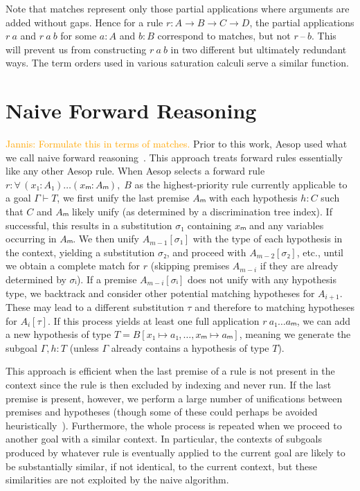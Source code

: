 \documentclass[runningheads]{llncs}
\newcommand{\jcom}[1]{{\textcolor{orange}{Jannis: #1}} }
\newcommand{\All}[2]{\ensuremath{\forall\, #1,\; #2}}
\begin{document}
Note that matches represent only those partial applications where arguments are added without gaps.
Hence for a rule $r : A → B → C → D$, the partial applications $r~a$ and $r~a~b$ for some $a : A$ and $b : B$ correspond to matches, but not $r~\text{--}~b$.
This will prevent us from constructing $r~a~b$ in two different but ultimately redundant ways.
The term orders used in various saturation calculi serve a similar function.

\section{Naive Forward Reasoning}%
\label{sec:naive}

\jcom{Formulate this in terms of matches.}
Prior to this work, Aesop used what we call naive forward reasoning~\cite{Aesop}.
This approach treats forward rules essentially like any other Aesop rule.
When Aesop selects a forward rule $r : \All{(x₁ : A₁) \dots (xₘ : Aₘ)}{B}$ as the highest-priority rule currently applicable to a goal $Γ ⊢ T$, we first unify the last premise $Aₘ$ with each hypothesis $h : C$ such that $C$ and $Aₘ$ likely unify (as determined by a discrimination tree index).
If successful, this results in a substitution $σ₁$ containing $xₘ$ and any variables occurring in $Aₘ$.
We then unify $A_{m-1}[σ₁]$ with the type of each hypothesis in the context, yielding a substitution $σ₂$, and proceed with $A_{m-2}[σ₂]$, etc., until we obtain a complete match for $r$ (skipping premises $A_{m-i}$ if they are already determined by $σᵢ$).
If a premise $A_{m-i}[σᵢ]$ does not unify with any hypothesis type, we backtrack and consider other potential matching hypotheses for $A_{i+1}$.
These may lead to a different substitution $τ$ and therefore to matching hypotheses for $A_{i}[τ]$.
If this process yields at least one full application $r~a₁ \dots aₘ$, we can add a new hypothesis of type $T = B[x₁ ↦ a₁, \dots, xₘ ↦ aₘ]$, meaning we generate the subgoal $Γ, h : T$ (unless $Γ$ already contains a hypothesis of type $T$).

This approach is efficient when the last premise of a rule is not present in the context since the rule is then excluded by indexing and never run.
If the last premise is present, however, we perform a large number of unifications between premises and hypotheses (though some of these could perhaps be avoided heuristically~\cite{TammetSubsumption}).
Furthermore, the whole process is repeated when we proceed to another goal with a similar context.
In particular, the contexts of subgoals produced by whatever rule is eventually applied to the current goal are likely to be substantially similar, if not identical, to the current context, but these similarities are not exploited by the naive algorithm.
\end{document}
